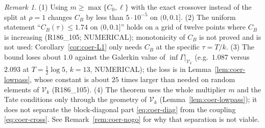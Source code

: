 \documentclass[11pt]{amsart}
\theoremstyle{definition}
\theoremstyle{remark}
\newtheorem{remark}[theorem]{Remark}
\begin{document}
\begin{remark}\label{rem:coer-B}
(1) Using $m\ge\max\{C_0,\ell\}$ with the exact crossover instead of the split at $\rho=1$ changes $C_B$ by less than
$5\cdot10^{-5}$ on $(0,0.1]$. (2) The uniform statement ``$C_B(\tau)\le1.74$ on $(0,0.1]$'' holds on a grid of
twelve points where $C_B$ is increasing (R186\_105; NUMERICAL); monotonicity of $C_B$ is not proved and is not used:
Corollary~\ref{cor:coer-L1} only needs $C_B$ at the specific $\tau=T/k$. (3) The bound loses about $1.0$ against
the Galerkin value of $\inf\Gamma|_{\mathcal V_k}$ (e.g.\ $1.087$ versus $2.093$ at $T=\frac12\log5$, $k=13$,
NUMERICAL); the loss is in Lemma~\ref{lem:coer-lowpass}, whose constant is about $25$ times larger than needed
on random elements of $\mathcal V_k$ (R186\_105). (4) The theorem uses the whole multiplier $m$ and the Tate
conditions only through the geometry of $\mathcal V_k$ (Lemma~\ref{lem:coer-lowpass}); it does not separate the
block-diagonal part \eqref{eq:coer-diag} from the coupling \eqref{eq:coer-cross}. See Remark~\ref{rem:coer-nogo}
for why that separation is not viable.
\end{remark}
\end{document}

